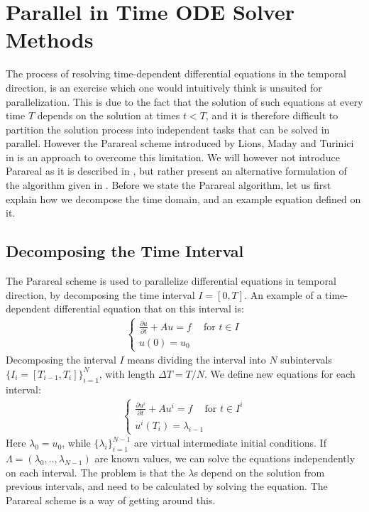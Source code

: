 \chapter{Parallel in Time ODE Solver Methods} \label{parareal_chap}
The process of resolving time-dependent differential equations in the temporal direction, is an exercise which one would intuitively think is unsuited for parallelization. This is due to the fact that the solution of such equations at every time $T$ depends on the solution at times $t<T$, and it is therefore difficult to partition the solution process into independent tasks that can be solved in parallel. However the Parareal scheme introduced by Lions, Maday and Turinici in \cite{lions2001resolution}is an approach to overcome this limitation. We will however not introduce Parareal as it is described in \cite{lions2001resolution}, but rather present an alternative formulation of the algorithm given in \cite{baffico2002parallel}. Before we state the Parareal algorithm, let us first explain how we decompose the time domain, and an example equation defined on it.
\section{Decomposing the Time Interval} \label{Para_dcomp_sec}
The Parareal scheme is used to parallelize differential equations in temporal direction, by decomposing the time interval $I=[0,T]$. An example of a time-dependent differential equation that on this interval is:
\begin{align}
\left\{
   	\begin{array}{lr}
		\frac{\partial u}{\partial t} + Au = f \ \quad \textrm{for $t \in I$} \\
		u(0)=u_0
	\end{array}
   \right. \label{unbroken}
\end{align} 
Decomposing the interval $I$ means dividing the interval into $N$ subintervals $\{I_i = [T_{i-1},T_{i}]\}_{i=1}^{N}$, with length $\Delta T = T/N$. We define new equations for each interval:
\begin{align}
\left\{
     \begin{array}{lr}
		\frac{\partial u^i}{\partial t} + Au^i = f \ \quad \textrm{for $t \in I^i$} \\
		u^i(T_i)=\lambda_{i-1}
	\end{array}
	\right.	\label{broken}
\end{align}
Here $\lambda_0=u_0$, while $\{\lambda_i\}_{i=1}^{N-1}$ are virtual intermediate initial conditions. If $\Lambda=(\lambda_0,..,\lambda_{N-1})$ are known values, we can solve the equations independently on each interval. The problem is that the $\lambda$s depend on the solution from previous intervals, and need to be calculated by solving the equation. The Parareal scheme is a way of getting around this.
